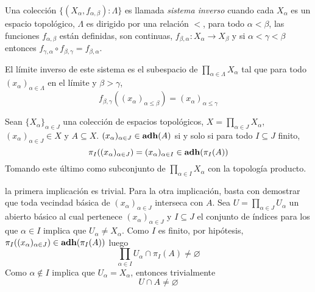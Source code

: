 \begin{Def}
  Una colección $\{(X_\alpha,f_{\alpha,\beta}):\Lambda\}$ es llamada
  \emph{sistema inverso} cuando cada $X_\alpha$ es un espacio topológico, $\Lambda$
  es dirigido por una relación $<$, para todo $\alpha<\beta$, las funciones
  $f_{\alpha,\beta}$ están definidas, son continuas, $f_{\beta,\alpha}\colon X_\alpha\longrightarrow X_\beta$
  y si $\alpha<\gamma<\beta$ entonces $f_{\gamma,\alpha}\circ f_{\beta,\gamma}=f_{\beta,\alpha}$.

  El límite inverso de este sistema es el subespacio de $\prod_{\alpha\in\Lambda}X_\alpha$ tal que
  para todo $(x_\alpha)_{\alpha\in\Lambda}$ en el límite y $\beta>\gamma$,
  \[f_{\beta,\gamma}((x_\alpha)_{\alpha\leq\beta})=(x_\alpha)_{\alpha\leq\gamma}\]
\end{Def}

\begin{Lema}
  Sean $\{X_\alpha\}_{\alpha\in J}$ una colección de espacios topológicos, $X=\prod_{\alpha\in J}X_\alpha$,
  $(x_\alpha)_{\alpha\in J}\in X$ y $A\subseteq X$. $(x_\alpha)_{\alpha\in J}\in\operatorname{\mathrm{\mathbf{adh}}}(A)$ si y solo si
  para todo $I\subseteq J$ finito, 
  \[\pi_I((x_\alpha)_{\alpha\in J})=(x_\alpha)_{\alpha\in I}\in \operatorname{\mathrm{\mathbf{adh}}}(\pi_I(A))\]
  Tomando este último como subconjunto de $\prod_{\alpha\in I}X_\alpha$ con la topología producto.
\end{Lema}
\begin{Demo}
  la primera implicación es trivial.
  Para la otra implicación, basta con demostrar que toda vecindad básica de $(x_\alpha)_{\alpha\in J}$
  interseca con $A$. Sea $U=\prod_{\alpha\in J}U_\alpha$ un abierto básico al cual pertenece
  $(x_\alpha)_{\alpha\in J}$ y $I\subseteq J$ el conjunto de índices para los que
  $\alpha\in I$ implica que $U_\alpha\neq X_\alpha$. Como $I$ es finito, por hipótesis,
  $\pi_I((x_\alpha)_{\alpha\in J})\in\operatorname{\mathrm{\mathbf{adh}}}(\pi_I(A))$ luego
  \[\prod_{\alpha\in I} U_\alpha\cap \pi_I(A)\neq\varnothing\]
  Como $\alpha\not\in I$ implica que $U_\alpha=X_\alpha$, entonces trivialmente
  \[U\cap A\neq \varnothing\]
\end{Demo}

